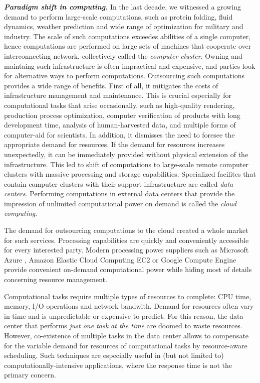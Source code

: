 \indent\textbf{\emph{Paradigm shift in computing.}}
In the last decade, we witnessed a growing demand to perform large-scale
computations, such as protein folding, fluid dynamics, weather prediction and
wide range of optimization for military and industry.
The scale of such computations exceedes abilities of a single computer, hence computations are performed on large sets of machines that cooperate over interconnecting network, collectively called the \emph{computer cluster}.
Owning and maintaing such infrastructure is often impractical and expensive, and parties look for alternative ways to perform computations.
Outsourcing such computations provides a wide range of benefits.
First of all, it mitigates the costs of infrastructure management and maintenance.
This is crucial especially for computational tasks that arise occasionally, such as high-quality rendering, production process optimization, computer verification of products with long development time, analysis of human-harvested data, and multiple forms of computer-aid for scientists.
In addition, it dismisses the need to foresee the appropriate demand for resources.
If the demand for resources increases unexpectedly, it can be immediately provided without physical extension of the infrastructure.
This led to shift of computations to large-scale remote computer clusters with massive processing and storage capabilities.
Specialized facilites that contain computer clusters with their support infrastructure are called \emph{data centers}.
Performing computations in external data centers that provide the impression of unlimited computational power on demand is called the \emph{cloud computing}.

The demand for outsourcing computations to the cloud created a whole market for such services.
Processing capabilities are quickly and conveniently accessible for every interested party.
Modern processing power suppliers such as Microsoft Azure \cite{url-azure}, Amazon Elastic Cloud Computing EC2 \cite{url-amazon-ec2} or Google Compute Engine \cite{url-gce} provide convenient on-demand computational power while hiding most of details concerning resource management.

Computational tasks require multiple types of resources to complete: CPU time, memory, I/O operations and network bandwith.
Demand for resources often vary in time and is unpredictable or expensive to predict.
For this reason, the data center that performs \emph{just one task at the time} are doomed to waste resources.
However, co-existence of multiple tasks in the data center allows to compensate for the variable demand for resources of computational tasks by resource-aware scheduling.
Such techniques are especially useful in (but not limited to) computationally-intensive applications, where the response time is not the primary concern.

